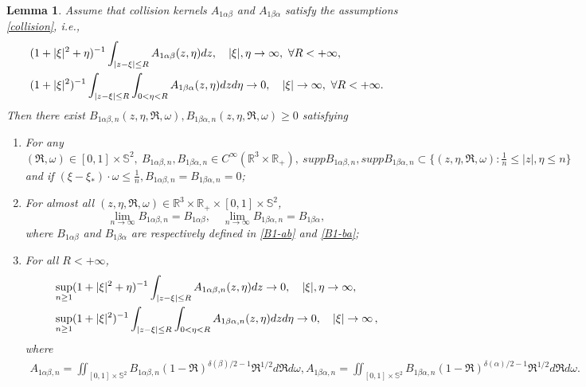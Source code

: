 \documentclass[10pt,a4paper]{amsart}
\newtheorem{lemma}{Lemma}
\def\R{\mathbb{R}}
\begin{document}
\begin{lemma}\label{Lemma 4.11}
	Assume that collision kernels $A_{1\alpha \beta }$ and $A_{1\beta \alpha }$ satisfy the assumptions \eqref{collision}, i.e.,
	\begin{equation*}{\small
		\begin{aligned}
			&(1+|\xi|^2 + \eta )^{-1} \int_{|z-\xi |\leq R } A_{1\alpha \beta } (z,\eta ) dz,  \quad |\xi|,\eta  \rightarrow \infty, \ \forall R <+\infty, \\
			&(1+|\xi|^2 )^{-1}\int_{|z-\xi |\leq R }  \int_{0<\eta < R } A_{1\beta \alpha } (z,\eta ) dzd\eta \rightarrow 0, \quad |\xi| \rightarrow \infty , \ \forall R <+\infty.
		\end{aligned}}
	\end{equation*}	
	Then there exist $B_{1\alpha \beta ,n }(z,\eta , \mathfrak{R},\omega ) ,B_{1 \beta \alpha ,n } (z,\eta , \mathfrak{R},\omega ) \geq 0 $ satisfying 
	\begin{enumerate}
		\item {For any $(\mathfrak{R},\omega)\in [0,1] \times \mathbb{S}^2,\ B_{1\alpha \beta , n } , B_{1 \beta \alpha ,n }  \in C^\infty (\R^3 \times \R_+),\ supp B_{1\alpha \beta , n },supp B_{1 \beta \alpha ,n } \subset \{(z,\eta , \mathfrak{R},\omega ): \frac{1}{n} \leq |z|,\eta \leq n \}$ and if $ (\xi -\xi_* ) \cdot \omega \leq \frac{1}{n} , B_{1\alpha \beta , n } =B_{1 \beta \alpha ,n }=0$;}\label{1 of Lemma 4.11}
		\item  {For almost all $(z,\eta , \mathfrak{R},\omega )\in \R^3 \times \R_+ \times [0,1] \times \mathbb{S}^2$,
		\begin{equation*}
  \lim \limits_{n\rightarrow \infty } B_{1\alpha \beta ,n } =B_{1\alpha \beta },\quad
 \lim \limits_{n\rightarrow \infty } B_{1\beta \alpha ,n } =B_{1\beta \alpha },
\end{equation*} 
where $B_{1 \alpha \beta}$ and $B_{1 \beta \alpha}$ are respectively defined in \eqref{B1-ab} and \eqref{B1-ba};} \label{2 of Lemma 4.11}
		\item {For all $R < + \infty$,
			\begin{equation*}{\small
				\begin{aligned}
					&\sup \limits_{n \geq 1} (1+|\xi|^2 + \eta )^{-1} \int_{|z-\xi |\leq R } A_{1\alpha \beta ,n } (z,\eta ) dz \rightarrow 0, \quad |\xi|, \eta \rightarrow \infty , \\
					&\sup \limits_{n \geq 1} (1+|\xi|^2 )^{-1}\int_{|z-\xi |\leq R }  \int_{0<\eta < R } A_{1\beta \alpha ,n} (z,\eta ) dzd\eta \rightarrow 0, \quad |\xi| \rightarrow \infty \,,
				\end{aligned}}
		\end{equation*}
   where 
{\small
    \begin{align*}
   A_{1\alpha \beta ,n } =\iint_{[0,1]\times \mathbb{S}^2} B_{1\alpha \beta ,n } (1-\mathfrak{R})^{\delta(\beta )/2-1}\mathfrak{R}^{1/2}  d\mathfrak{R}d\omega, A_{1\beta \alpha ,n } =\iint_{[0,1]\times \mathbb{S}^2} B_{1\beta \alpha ,n }   (1-\mathfrak{R})^{\delta(\alpha )/2-1}\mathfrak{R}^{1/2}d\mathfrak{R}d\omega.
   \end{align*}}
  }\label{3 of Lemma 4.11}
	\end{enumerate}
\end{lemma}
\end{document}
